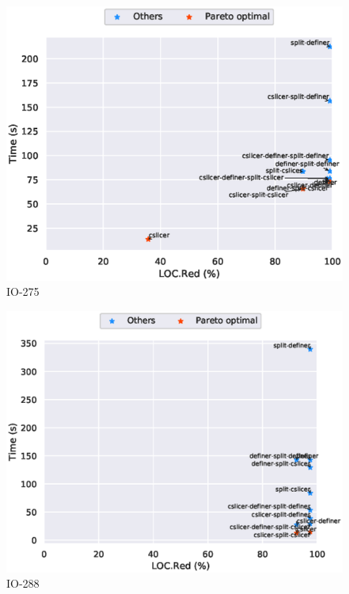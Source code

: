 \begin{figure}
\includegraphics[scale=0.7]{plots/pareto/IO-275-pareto}
\caption{IO-275}
\end{figure}
\begin{figure}
\includegraphics[scale=0.7]{plots/pareto/IO-288-pareto}
\caption{IO-288}
\end{figure}
